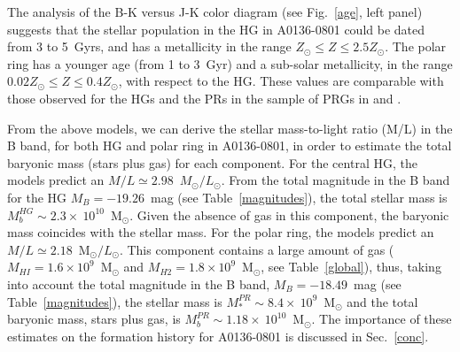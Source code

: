 \documentclass[useAMS,usenatbib]{mn2e}
\begin{document}
The analysis of the B-K versus J-K color diagram (see Fig.~\ref{age},
left panel) suggests that the stellar population in the HG in
A0136-0801 could be dated from 3 to 5~Gyrs, and has a metallicity in the range 
$Z_{\odot} \le Z \le 2.5 Z_{\odot}$. The polar ring  has a younger age (from 1 to 3~Gyr) and a sub-solar metallicity, in the range $0.02Z_{\odot} \le Z \le 0.4Z_{\odot}$, with respect to the HG. These values are comparable with those observed for the HGs and the PRs in the sample of PRGs in
\citet{Iod02a} and \citet{Iod02b}.

From the above models, we can derive the stellar mass-to-light ratio
(M/L) in the B band, for both HG and polar ring in A0136-0801, in
order to estimate the total baryonic mass (stars plus gas) for each
component.  For the central HG, the models predict an $M/L \simeq
2.98$~$M_{\odot}/L_{\odot}$. From the total magnitude in the B band for
the HG $M_B = -19.26$~mag (see Table~\ref{magnitudes}), the total
stellar mass is $M_b^{HG} \sim 2.3 \times\ 10^{10}$~M$_{\odot}$. Given
the absence of gas in this component, the baryonic mass coincides with
the stellar mass.
%
For the polar ring, the models predict an $M/L \simeq 2.18
$~M$_{\odot}/L_{\odot}$. This component contains a large amount of gas
($M_{HI} = 1.6 \times 10^9$~M$_{\odot}$ and $M_{H2} = 1.8 \times 10^9$~M$_{\odot}$, see Table~\ref{global}), thus, taking
into account the total magnitude in the B band, $M_B = -18.49$~mag
(see Table~\ref{magnitudes}),  the stellar mass is $M_{\ast}^{PR}
  \sim 8.4 \times\ 10^{9}$~M$_{\odot}$ and the total baryonic mass, stars plus gas,
is  $M_b^{PR} \sim 1.18 \times\ 10^{10}$~M$_{\odot}$. The importance of
these estimates on the formation history for A0136-0801 is discussed
in Sec.~\ref{conc}.
\end{document}
